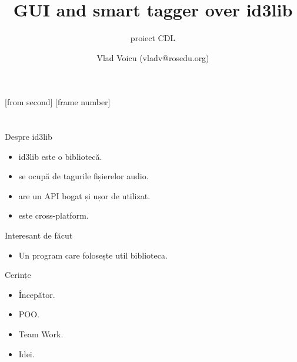 \documentclass{beamer}
\title[id3lib]{GUI and smart tagger over id3lib}
\subtitle{proiect CDL}
\institute[ROSEdu]{ROSEdu}
\author[VV]{Vlad Voicu (vladv@rosedu.org)}
\begin{document}
[from second]
[frame number]

\frame{\titlepage}

\section{}

\begin{frame}{Despre id3lib}
	\begin{itemize}
        \item id3lib este o bibliotecă. 
		\item se ocupă de tagurile fișierelor audio.
		\item are un API bogat și ușor de utilizat.
		\item este cross-platform.
	\end{itemize}
\end{frame}

\begin{frame}{Interesant de făcut}
  \begin{itemize}
    \item Un program care folosește util biblioteca.
  \end{itemize}
\end{frame}

\begin{frame}{Cerințe}
  \begin{itemize}
    \item Începător.
    \item POO.
	\item Team Work.
	\item Idei.
  \end{itemize}
\end{frame}
\end{document}
